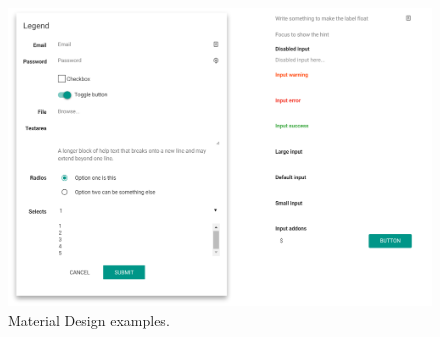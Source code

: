 \begin{figure}[H]
	\centering
    \includegraphics[width=\textwidth]{images/design/bootstrap_material_design}
    \caption[Material Design examples]{Material Design examples\protect\footnotemark.}
    \label{fig:material_design_examples}
\end{figure}

